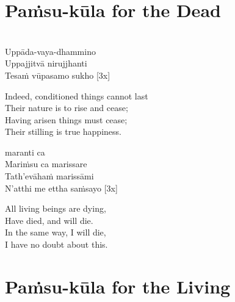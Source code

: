 \section{Paṁsu-kūla for the Dead}
\label{pamsu-kula-dead}

\vspace{-0.8em}

\begin{pali-hang}
\\
Uppāda-vaya-dhammino\\
Uppajjitvā nirujjhanti\\
Tesaṁ vūpasamo sukho \hfill{[3x]}
\end{pali-hang}

\begin{english-verses}
  Indeed, conditioned things cannot last\\
  Their nature is to rise and cease;\hyperlink{endnote1-appendix}{\hypertarget{endnote1-body}{}}\\
  Having arisen things must cease;\\
  Their stilling is true happiness.
\end{english-verses}

\suttaRef{[DN 16]}

\begin{pali-hang-continued}
 maranti ca\\
Mariṁsu ca marissare\\
Tath'evāhaṁ marissāmi\\
N'atthi me ettha saṁsayo \hfill{[3x]}
\end{pali-hang-continued}

\begin{english-verses}
  All living beings are dying,\\
  Have died, and will die.\\
  In the same way, I will die,\\
  I have no doubt about this.
\end{english-verses}

\suttaRef{[Thai]}

\section{Paṁsu-kūla for the Living}
\label{pamsu-kula-living}

\vspace{-0.6em}

